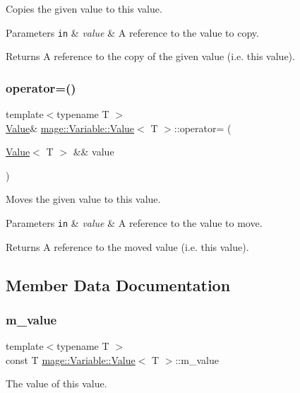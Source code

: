 Copies the given value to this value.


\begin{DoxyParams}[1]{Parameters}
\mbox{\tt in}  & {\em value} & A reference to the value to copy. \\
\hline
\end{DoxyParams}
\begin{DoxyReturn}{Returns}
A reference to the copy of the given value (i.\+e. this value). 
\end{DoxyReturn}
\hypertarget{structmage_1_1_variable_1_1_value_a2185d5eeb8f321a7e4f6d97463af4987}{}\label{structmage_1_1_variable_1_1_value_a2185d5eeb8f321a7e4f6d97463af4987} 
\subsubsection{\texorpdfstring{operator=()}{operator=()}\hspace{0.1cm}{\footnotesize\ttfamily [2/2]}}
{\footnotesize\ttfamily template$<$typename T $>$ \\
\hyperlink{structmage_1_1_variable_1_1_value}{Value}\& \hyperlink{structmage_1_1_variable_1_1_value}{mage\+::\+Variable\+::\+Value}$<$ T $>$\+::operator= (\begin{DoxyParamCaption}\item[{\hyperlink{structmage_1_1_variable_1_1_value}{Value}$<$ T $>$ \&\&}]{value }\end{DoxyParamCaption})\hspace{0.3cm}{\ttfamily [delete]}}

Moves the given value to this value.


\begin{DoxyParams}[1]{Parameters}
\mbox{\tt in}  & {\em value} & A reference to the value to move. \\
\hline
\end{DoxyParams}
\begin{DoxyReturn}{Returns}
A reference to the moved value (i.\+e. this value). 
\end{DoxyReturn}


\subsection{Member Data Documentation}
\hypertarget{structmage_1_1_variable_1_1_value_a338caf846aa4dc87caf2620fa94b5369}{}\label{structmage_1_1_variable_1_1_value_a338caf846aa4dc87caf2620fa94b5369} 
\subsubsection{\texorpdfstring{m\+\_\+value}{m\_value}}
{\footnotesize\ttfamily template$<$typename T $>$ \\
const T \hyperlink{structmage_1_1_variable_1_1_value}{mage\+::\+Variable\+::\+Value}$<$ T $>$\+::m\+\_\+value\hspace{0.3cm}{\ttfamily [private]}}

The value of this value. 